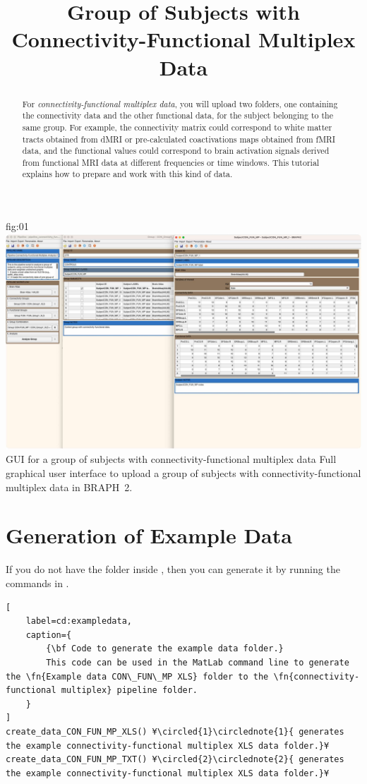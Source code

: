 \documentclass[justified]{tufte-handout}
\title{Group of Subjects with Connectivity-Functional Multiplex Data}
\begin{document}
\maketitle

\begin{abstract}
\noindent
For \emph{connectivity-functional multiplex data}, you will upload two folders, one containing the connectivity data and the other functional data, for the subject belonging to the same group. For example, the connectivity matrix could correspond to white matter tracts obtained from dMRI or pre-calculated coactivations maps obtained from fMRI data, and the functional values could correspond to brain activation signals derived from functional MRI data at different frequencies or time windows. This tutorial explains how to prepare and work with this kind of data.
\end{abstract}


\tableofcontents

	{fig:01}
	{\includegraphics{fig01.jpg}}
	{GUI for a group of subjects with connectivity-functional multiplex data}
	{
	Full graphical user interface to upload a group of subjects with connectivity-functional multiplex data in BRAPH~2. 
	}

\clearpage
\section{Generation of Example Data}

If you do not have the  folder inside , then you can generate it by running the commands in .

\begin{lstlisting}[
	label=cd:exampledata,
	caption={
		{\bf Code to generate the example data folder.}
		This code can be used in the MatLab command line to generate the \fn{Example data CON\_FUN\_MP XLS} folder to the \fn{connectivity-functional multiplex} pipeline folder.
	}
]
create_data_CON_FUN_MP_XLS() ¥\circled{1}\circlednote{1}{ generates the example connectivity-functional multiplex XLS data folder.}¥
create_data_CON_FUN_MP_TXT() ¥\circled{2}\circlednote{2}{ generates the example connectivity-functional multiplex XLS data folder.}¥
\end{lstlisting}
\end{document}
